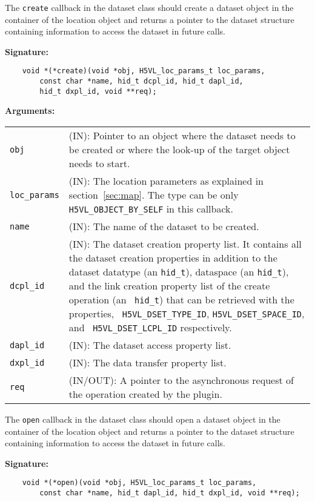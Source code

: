 The {\tt create} callback in the dataset class should create a dataset
object in the container of the location object and returns a pointer
to the dataset structure containing information to access the dataset
in future calls.

\textbf{Signature:}
\begin{lstlisting}
    void *(*create)(void *obj, H5VL_loc_params_t loc_params, 
        const char *name, hid_t dcpl_id, hid_t dapl_id, 
        hid_t dxpl_id, void **req);
\end{lstlisting}

\textbf{Arguments:}\\
\begin{tabular}{l p{10cm}}
  {\tt obj} & (IN): Pointer to an object where the dataset needs
  to be created or where the look-up of the target object needs to
  start.\\
  {\tt loc\_params} & (IN): The location parameters as explained in
  section~\ref{sec:map}. The type can be only {\tt
    H5VL\_OBJECT\_BY\_SELF} in this callback. \\
  {\tt name} & (IN): The name of the dataset to be created.\\
  {\tt dcpl\_id} & (IN): The dataset creation property list. It contains
  all the dataset creation properties in addition to the dataset
  datatype (an {\tt hid\_t}), dataspace (an {\tt hid\_t}), and the
  link creation property list of the create operation (an {\tt
    hid\_t}) that can be retrieved with the properties, {\tt
    H5VL\_DSET\_TYPE\_ID}, {\tt H5VL\_DSET\_SPACE\_ID},  and {\tt
    H5VL\_DSET\_LCPL\_ID} respectively.\\
  {\tt dapl\_id} & (IN): The dataset access property list.\\
  {\tt dxpl\_id} & (IN): The data transfer property list.\\
  {\tt req} & (IN/OUT): A pointer to the asynchronous request of the
  operation created by the plugin.\\
\end{tabular}

The {\tt open} callback in the dataset class should open a dataset
object in the container of the location object and returns a pointer
to the dataset structure containing information to access the dataset
in future calls.

\textbf{Signature:}
\begin{lstlisting}
    void *(*open)(void *obj, H5VL_loc_params_t loc_params, 
        const char *name, hid_t dapl_id, hid_t dxpl_id, void **req);
\end{lstlisting}

